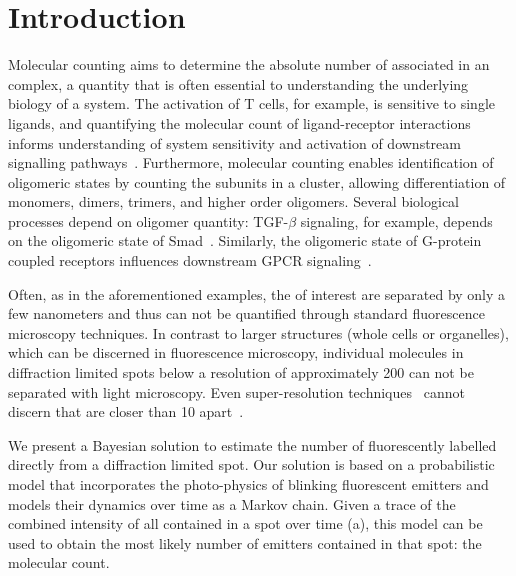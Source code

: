 \section{Introduction}



%
Molecular counting aims to determine the absolute number of \smallobjects
associated in an complex, a quantity that is often essential to understanding
the underlying biology of a system.
  The activation of T cells, for example, is sensitive to single ligands, and
  quantifying the molecular count of ligand-receptor interactions informs
  understanding of system sensitivity and activation of downstream signalling 
  pathways~\citep{irvine_2002}.
  Furthermore, molecular counting enables identification of oligomeric states by
  counting the subunits in a cluster, allowing differentiation of monomers, dimers,
  trimers, and higher order oligomers.
  Several biological processes depend on oligomer quantity: TGF-$\beta$ signaling,
  for example, depends on the oligomeric state of Smad~\citep{inman_2002,
  moustakas_2002}.
  Similarly, the oligomeric state of G-protein coupled receptors influences
  downstream GPCR signaling~\citep{felce_2018, breitwieser_2004}.

%
Often, as in the aforementioned examples, the \smallobjects of interest are separated by only a few
nanometers and thus can not be quantified through standard fluorescence
microscopy techniques.
  In contrast to larger structures (whole cells or organelles), which can
  be discerned in fluorescence microscopy, individual molecules in
  diffraction limited spots below a resolution of approximately 200 \nanometer can not
  be separated with light microscopy.
  Even super-resolution techniques~\citep{betzig_2006,rust_2006,rittweger_sted_2009} cannot discern 
  \smallobjects that are closer than 10 \nanometer apart~\citep{valli_seeing_2021}.

%
We present a Bayesian solution to estimate the number of fluorescently labelled
\smallobjects directly from a diffraction limited spot.
  Our solution is based on a probabilistic model that incorporates the
  photo-physics of blinking fluorescent emitters and models their dynamics over
  time as a Markov chain.
  Given a trace of the combined intensity of all \smallobjects contained in a
  spot over time (a), this model can be used to obtain the 
  most likely number of emitters contained in that spot: the molecular count.

